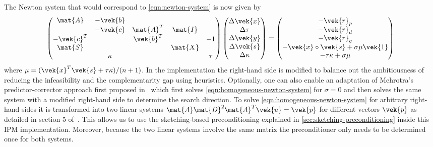 The Newton system that would correspond to \cref{eqn:newton-system} is now given by
\begin{equation}\label{eqn:homogeneous-newton-system}
  \begin{pmatrix}
    \mat{A}    & -\vek{b} &           &         &         \\
               & -\vek{c} & \mat{A}^T & \mat{I} &         \\
    -\vek{c}^T &          & \vek{b}^T &         & -1 \\
    \mat{S}    &          &           & \mat{X} &         \\
               & \kappa   &           &         & \tau
  \end{pmatrix}
  \begin{pmatrix}
    \Delta\vek{x} \\
    \Delta\tau \\
    \Delta\vek{y} \\
    \Delta\vek{s} \\
    \Delta\kappa
  \end{pmatrix}
  =
  \begin{pmatrix}
    -\vek{r}_p \\
    -\vek{r}_d \\
    -\vek{r}_g \\
    -\vek{x} \circ \vek{s} + \sigma \mu \vek{1} \\
    -\tau \kappa + \sigma \mu
  \end{pmatrix}
\end{equation}
where \(\mu = (\vek{x}^T \vek{s} + \tau \kappa)/(n+1)\).
In the implementation the right-hand side is modified to balance out the ambitiousness of reducing the infeasibility and the complementarity gap using heuristics.
Optionally, one can also enable an adaptation of Mehrotra's predictor-corrector approach first proposed in~\cite{Mehrotra-PredictorCorrector} which first solves \cref{eqn:homogeneous-newton-system} for \(\sigma = 0\) and then solves the same system with a modified right-hand side to determine the search direction.
To solve \cref{eqn:homogeneous-newton-system} for arbitrary right-hand sides it is transformed into two linear systems \(\mat{A}\mat{D}^2\mat{A}^T\vek{u} = \vek{p}\) for different vectors \(\vek{p}\) as detailed in section 5 of~\cite{AndersenAndersen-MosekInteriorPointMethod}.
This allows us to use the sketching-based preconditioning explained in \cref{sec:sketching-preconditioning} inside this IPM implementation.
Moreover, because the two linear systems involve the same matrix the preconditioner only needs to be determined once for both systems.

